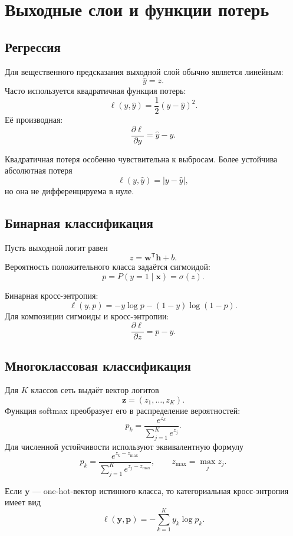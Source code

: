 \documentclass[12pt,a4paper]{article}
\theoremstyle{definition}
\newcommand{\T}{\mathsf{T}}
\newcommand{\1}{\mathbf{1}}
\begin{document}
\section{Выходные слои и функции потерь}

\subsection{Регрессия}

Для вещественного предсказания выходной слой обычно является линейным:
\[
    \widehat{y}=z.
\]
Часто используется квадратичная функция потерь:
\[
    \ell(y,\widehat{y})
    =
    \frac{1}{2}(y-\widehat{y})^2.
\]
Её производная:
\[
    \frac{\partial\ell}{\partial\widehat{y}}
    =
    \widehat{y}-y.
\]

Квадратичная потеря особенно чувствительна к выбросам. Более устойчива
абсолютная потеря
\[
    \ell(y,\widehat{y})=|y-\widehat{y}|,
\]
но она не дифференцируема в нуле.

\subsection{Бинарная классификация}

Пусть выходной логит равен
\[
    z=\bm{w}^{\T}\bm{h}+b.
\]
Вероятность положительного класса задаётся сигмоидой:
\[
    p=P(y=1\mid\bm{x})=\sigma(z).
\]

Бинарная кросс-энтропия:
\[
    \ell(y,p)
    =
    -y\log p-(1-y)\log(1-p).
\]
Для композиции сигмоиды и кросс-энтропии:
\[
    \frac{\partial\ell}{\partial z}=p-y.
\]

\subsection{Многоклассовая классификация}

Для $K$ классов сеть выдаёт вектор логитов
\[
    \bm{z}=(z_1,\ldots,z_K).
\]
Функция softmax преобразует его в распределение вероятностей:
\[
    p_k
    =
    \frac{e^{z_k}}
         {\sum_{j=1}^{K}e^{z_j}}.
\]
Для численной устойчивости используют эквивалентную формулу
\[
    p_k
    =
    \frac{e^{z_k-z_{\max}}}
         {\sum_{j=1}^{K}e^{z_j-z_{\max}}},
    \qquad
    z_{\max}=\max_jz_j.
\]

Если $\bm{y}$ --- one-hot-вектор истинного класса, то категориальная
кросс-энтропия имеет вид
\[
    \ell(\bm{y},\bm{p})
    =
    -\sum_{k=1}^{K}y_k\log p_k.
\]
\end{document}
